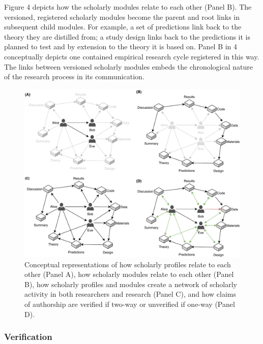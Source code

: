 \documentclass[a4paper]{article}
\begin{document}
Figure 4 depicts how the scholarly modules relate to each other (Panel
B). The versioned, registered scholarly modules become the parent and
root links in subsequent child modules. For example, a set of
predictions link back to the theory they are distilled from; a study
design links back to the predictions it is planned to test and by
extension to the theory it is based on. Panel B in 4 conceptually
depicts one contained empirical research cycle registered in this way.
The links between versioned scholarly modules embeds the chronological
nature of the research process in its communication.

\begin{figure}

{\centering \includegraphics[width=1\linewidth]{assets/fig4} 

}

\caption{Conceptual representations of how scholarly profiles relate to each other (Panel A), how scholarly modules relate to each other (Panel B), how scholarly profiles and modules create a network of scholarly activity in both researchers and research (Panel C), and how claims of authorship are verified if two-way or unverified if one-way (Panel D).}\label{fig:unnamed-chunk-6}
\end{figure}

\hypertarget{verification}{%
\subsubsection{Verification}\label{verification}}
\end{document}
